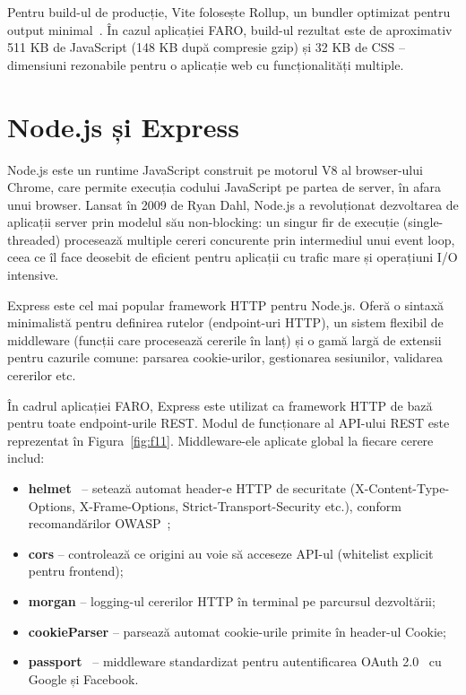 \documentclass[12pt,a4paper,oneside]{report}
\begin{document}
Pentru build-ul de producție, Vite folosește Rollup, un bundler optimizat pentru output minimal~\cite{ref:vite}. În cazul aplicației FARO, build-ul rezultat este de aproximativ 511 KB de JavaScript (148 KB după compresie gzip) și 32 KB de CSS -- dimensiuni rezonabile pentru o aplicație web cu funcționalități multiple.

\section{Node.js și Express}

Node.js este un runtime JavaScript construit pe motorul V8 al browser-ului Chrome, care permite execuția codului JavaScript pe partea de server, în afara unui browser. Lansat în 2009 de Ryan Dahl, Node.js a revoluționat dezvoltarea de aplicații server prin modelul său non-blocking: un singur fir de execuție (single-threaded) procesează multiple cereri concurente prin intermediul unui event loop, ceea ce îl face deosebit de eficient pentru aplicații cu trafic mare și operațiuni I/O intensive. \cite{ref:nodejs}

Express este cel mai popular framework HTTP pentru Node.js. Oferă o sintaxă minimalistă pentru definirea rutelor (endpoint-uri HTTP), un sistem flexibil de middleware (funcții care procesează cererile în lanț) și o gamă largă de extensii pentru cazurile comune: parsarea cookie-urilor, gestionarea sesiunilor, validarea cererilor etc. \cite{ref:express}

În cadrul aplicației FARO, Express este utilizat ca framework HTTP de bază pentru toate endpoint-urile REST. Modul de funcționare al API-ului REST este reprezentat în Figura~\ref{fig:f11}. Middleware-ele aplicate global la fiecare cerere includ:

\begin{itemize}[leftmargin=2cm,itemsep=2pt]
  \item \textbf{helmet}~\cite{ref:helmet} -- setează automat header-e HTTP de securitate (X-Content-Type-Options, X-Frame-Options, Strict-Transport-Security etc.), conform recomandărilor OWASP~\cite{ref:owasp};
  \item \textbf{cors} -- controlează ce origini au voie să acceseze API-ul (whitelist explicit pentru frontend);
  \item \textbf{morgan} -- logging-ul cererilor HTTP în terminal pe parcursul dezvoltării;
  \item \textbf{cookieParser} -- parsează automat cookie-urile primite în header-ul Cookie;
  \item \textbf{passport}~\cite{ref:passport} -- middleware standardizat pentru autentificarea OAuth 2.0~\cite{ref:oauth2} cu Google și Facebook.
\end{itemize}
\end{document}
